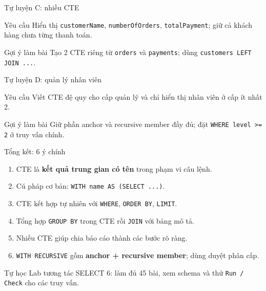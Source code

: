 \documentclass[aspectratio=169,10pt]{beamer}
\newcommand{\code}[1]{\texttt{#1}}
\begin{document}
\begin{frame}[fragile]{Tự luyện C: nhiều CTE}
\begin{block}{Yêu cầu}
Hiển thị \code{customerName}, \code{numberOfOrders}, \code{totalPayment}; giữ cả khách hàng chưa từng thanh toán.
\end{block}
\begin{alertblock}{Gợi ý làm bài}
Tạo 2 CTE riêng từ \code{orders} và \code{payments}; dùng \code{customers LEFT JOIN ...}.
\end{alertblock}
\end{frame}

\begin{frame}[fragile]{Tự luyện D: quản lý nhân viên}
\begin{block}{Yêu cầu}
Viết CTE đệ quy cho cấp quản lý và chỉ hiển thị nhân viên ở cấp ít nhất 2.
\end{block}
\begin{alertblock}{Gợi ý làm bài}
Giữ phần anchor và recursive member đầy đủ; đặt \code{WHERE level >= 2} ở truy vấn chính.
\end{alertblock}
\end{frame}

\begin{frame}[fragile]{Tổng kết: 6 ý chính}

\begin{enumerate}
\item CTE là \textbf{kết quả trung gian có tên} trong phạm vi câu lệnh.
\item Cú pháp cơ bản: \code{WITH name AS (SELECT ...)}.
\item CTE kết hợp tự nhiên với \code{WHERE}, \code{ORDER BY}, \code{LIMIT}.
\item Tổng hợp \code{GROUP BY} trong CTE rồi \code{JOIN} với bảng mô tả.
\item Nhiều CTE giúp chia báo cáo thành các bước rõ ràng.
\item \code{WITH RECURSIVE} gồm \textbf{anchor + recursive member}; dùng duyệt phân cấp.
\end{enumerate}
\vspace{.3em}
\begin{block}{Tự học}
Lab tương tác SELECT 6: làm đủ 45 bài, xem schema và thử \code{Run / Check} cho các truy vấn.
\end{block}
\end{frame}
\end{document}
